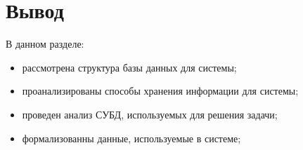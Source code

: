 \section{Вывод}

В данном разделе:

\begin{itemize}
    \item рассмотрена структура базы данных для системы;
    \item проанализированы способы хранения информации для системы;
    \item проведен анализ СУБД, используемых для решения задачи;
    \item формализованны данные, используемые в системе;
\end{itemize}
